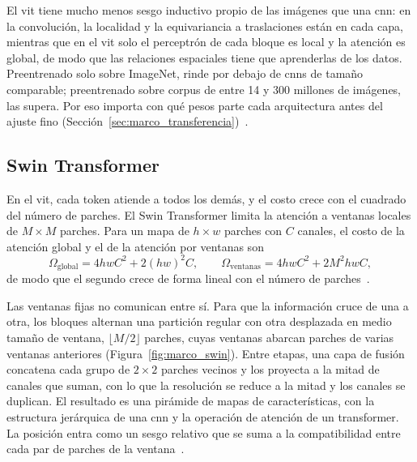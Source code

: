 

El \gls{vit} tiene mucho menos sesgo inductivo propio de las imágenes que una \gls{cnn}: en la convolución, la
localidad y la equivariancia a traslaciones están en cada capa, mientras que en el \gls{vit} solo el
perceptrón de cada bloque es local y la atención es global, de modo que las relaciones espaciales tiene que
aprenderlas de los datos. Preentrenado solo sobre
ImageNet, rinde por debajo de \glspl{cnn} de tamaño comparable; preentrenado sobre
corpus de entre 14 y 300 millones de imágenes, las supera. Por eso importa con qué pesos parte cada
arquitectura antes del ajuste fino (Sección~\ref{sec:marco_transferencia})~\cite{dosovitskiy2021image}.

\subsection{Swin Transformer}
\label{sec:marco_swin}

En el \gls{vit}, cada token atiende a todos los demás, y el costo crece con el cuadrado del número de parches.
El Swin Transformer limita la atención a ventanas locales de $M \times M$ parches. Para un mapa de
$h \times w$ parches con $C$ canales, el costo de la atención global y el de la atención por ventanas son
\begin{equation}
    \Omega_{\text{global}} = 4hwC^2 + 2(hw)^2C, \qquad \Omega_{\text{ventanas}} = 4hwC^2 + 2M^2hwC,
    \label{eq:marco_swin_costo}
\end{equation}
de modo que el segundo crece de forma lineal con el número de parches~\cite{liu2021swin}.

Las ventanas fijas no comunican entre sí. Para que la información cruce de una a otra, los bloques alternan una
partición regular con otra desplazada en medio tamaño de ventana, $\lfloor M/2 \rfloor$ parches, cuyas
ventanas abarcan parches de varias ventanas anteriores (Figura~\ref{fig:marco_swin}). Entre etapas, una capa
de fusión concatena cada grupo de $2 \times 2$ parches vecinos y los proyecta a la mitad de canales que suman,
con lo que la resolución se reduce a la mitad y los canales se duplican. El resultado es una pirámide de mapas
de características, con la estructura jerárquica de una \gls{cnn} y la operación de atención de un
transformer. La posición entra como un sesgo relativo que se suma a la compatibilidad entre cada par de parches
de la ventana~\cite{liu2021swin}.



